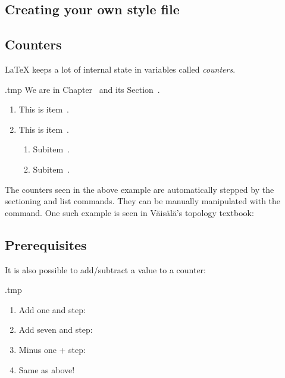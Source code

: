 \section{Creating your own style file}



%
%
%
\section{Counters}

\LaTeX{} keeps a lot of internal state in variables called \emph{counters}.

\begin{VerbatimOut}{\jobname.tmp}
We are in Chapter~
and its Section~.

\begin{enumerate}
\item This is item~.
\item This is item~.
  \begin{enumerate}
  \item Subitem~.
  \item Subitem~.
  \end{enumerate}
\end{enumerate}
\end{VerbatimOut}
\ShowExample

The counters seen in the above example are automatically stepped by the sectioning and list commands.
They can be manually manipulated with the  command.
One such example is seen in Väisälä's topology textbook:

\begin{ExampleCode}
\setcounter{chapter}{-1}
\chapter{Prerequisites}

\end{ExampleCode}

It is also possible to add/subtract a value to a counter:
%
\begin{VerbatimOut}{\jobname.tmp}
\begin{enumerate}
\item Add one and step:
\item Add seven and step:
  \addtocounter{enumi}{7}
\item Minus one + step:
  \addtocounter{enumi}{-1}
\item Same as above!
\end{enumerate}
\end{VerbatimOut}
\ShowExample

